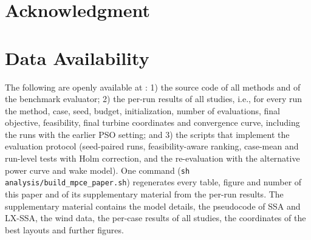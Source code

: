 \section*{Acknowledgment}

\section*{Data Availability}
The following are openly available at : 1) the source code of all methods and of the benchmark evaluator; 2) the per-run results of all studies, i.e., for every run the method, case, seed, budget, initialization, number of evaluations, final objective, feasibility, final turbine coordinates and convergence curve, including the runs with the earlier PSO setting; and 3) the scripts that implement the evaluation protocol (seed-paired runs, feasibility-aware ranking, case-mean and run-level tests with Holm correction, and the re-evaluation with the alternative power curve and wake model). One command (\texttt{sh analysis/build\_mpce\_paper.sh}) regenerates every table, figure and number of this paper and of its supplementary material from the per-run results. The supplementary material contains the model details, the pseudocode of SSA and LX-SSA, the wind data, the per-case results of all studies, the coordinates of the best layouts and further figures.

